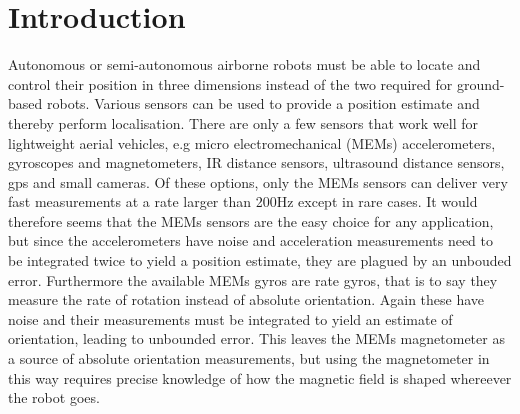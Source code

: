 \section{Introduction}
Autonomous or semi-autonomous airborne robots must be able to locate and control their position in three dimensions instead of
the two required for ground-based robots. Various sensors can be used to provide a position estimate and thereby perform localisation.
There are only a few sensors that work well for lightweight aerial vehicles, e.g micro electromechanical (MEMs) accelerometers, 
gyroscopes and magnetometers, IR distance sensors, ultrasound distance sensors, gps and small cameras. Of these options, only the MEMs
sensors can deliver very fast measurements at a rate larger than 200Hz except in rare cases. It would therefore seems that the MEMs
sensors are the easy choice for any application, but since the accelerometers have noise and acceleration measurements need to be 
integrated twice to yield a position estimate, they are plagued by an unbouded error. Furthermore the available MEMs gyros are rate 
gyros, that is to say they measure the rate of rotation instead of absolute orientation. Again these have noise and their measurements
must be integrated to yield an estimate of orientation, leading to unbounded error. This leaves the MEMs magnetometer as a source of
absolute orientation measurements, but using the magnetometer in this way requires precise knowledge of how the magnetic field is 
shaped whereever the robot goes.
